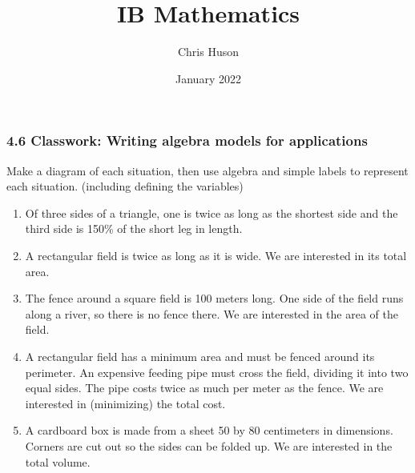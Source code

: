 \documentclass[12pt, twoside]{article}
\title{IB Mathematics}
\author{Chris Huson}
\date{January 2022}
\begin{document}
\subsubsection*{4.6 Classwork: Writing algebra models for applications}
Make a diagram of each situation, then use algebra and simple labels to represent each situation. (including defining the variables)
\begin{enumerate}[itemsep=6cm]
\item Of three sides of a triangle, one is twice as long as the shortest side and the third side is 150\% of the short leg in length.
\item A rectangular field is twice as long as it is wide. We are interested in its total area.
\item The fence around a square field is 100 meters long. One side of the field runs along a river, so there is no fence there. We are interested in the area of the field.
\item A rectangular field has a minimum area and must be fenced around its perimeter. An expensive feeding pipe must cross the field, dividing it into two equal sides. The pipe costs twice as much per meter as the fence. We are interested in (minimizing) the total cost. \vspace{2cm}
\item A cardboard box is made from a sheet 50 by 80 centimeters in dimensions. Corners are cut out so the sides can be folded up. We are interested in the total volume.


\end{enumerate}
\end{document}
